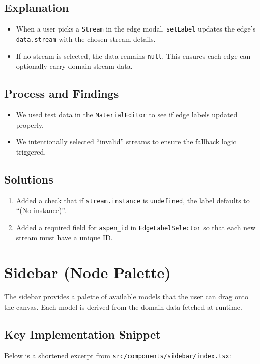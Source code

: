 \documentclass{article}
\begin{document}
\subsection{Explanation}
\begin{itemize}
  \item When a user picks a \texttt{Stream} in the edge modal, \texttt{setLabel} updates the edge’s \texttt{data.stream} with the chosen stream details.
  \item If no stream is selected, the data remains \texttt{null}. This ensures each edge can optionally carry domain stream data.
\end{itemize}

\subsection{Process and Findings}
\begin{itemize}
  \item We used test data in the \texttt{MaterialEditor} to see if edge labels updated properly. 
  \item We intentionally selected “invalid” streams to ensure the fallback logic triggered.
\end{itemize}

\subsection{Solutions}
\begin{enumerate}
  \item Added a check that if \texttt{stream.instance} is \texttt{undefined}, the label defaults to “(No instance)”.
  \item Added a required field for \texttt{aspen\_id} in \texttt{EdgeLabelSelector} so that each new stream must have a unique ID.
\end{enumerate}

\vspace{1em}
\section{Sidebar (Node Palette)}

The sidebar provides a palette of available models that the user can drag onto the canvas. Each model is derived from the domain data fetched at runtime.

\subsection{Key Implementation Snippet}
Below is a shortened excerpt from \texttt{src/components/sidebar/index.tsx}:
\end{document}

